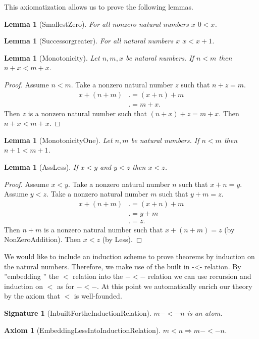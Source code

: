 \documentclass[10pt]{article}
\newenvironment{forthel}{\begin{leftbar}}{\end{leftbar}}
\theoremstyle{definition}
\theoremstyle{plain}
\newtheorem{signature}[theorem]{Signature}
\newtheorem{lemma}[theorem]{Lemma}
\newtheorem{axiom}[theorem]{Axiom}
\theoremstyle{remark}
\begin{document}
This axiomatization allows us to prove the following lemmas.
\begin{forthel}
	\begin{lemma}[SmallestZero]
		For all nonzero natural numbers $x$ $0<x$.
	\end{lemma}
	\begin{lemma}[Successorgreater]
		For all natural numbers $x$ $x<x+1$.
	\end{lemma}
	\begin{lemma}[Monotonicity]
		Let $n,m,x$ be natural numbers. If $n<m$ then $n+x < m+x$.
	\end{lemma}
	\begin{proof}
			Assume $n < m$.
			Take a nonzero natural number $z$ such that $n+z=m$.
			\begin{align*}
				x + (n+m) &.= (x+n)+m \tag*{AssAdd, ComAdd} \\
					  &.= m+x.
			\end{align*}
			Then $z$ is a nonzero natural number such that $(n+x)+z=m+x$.
			Then $n+x < m+x$.
	\end{proof}
	\begin{lemma}[MonotonicityOne]
		Let $n,m$ be natural numbers. If $n<m$ then $n+1<m+1$.
	\end{lemma}
	\begin{lemma}[AssLess]
		If $x<y$ and $y<z$ then $x<z$.
	\end{lemma}
	\begin{proof}
		Assume $x<y$. Take a nonzero natural number $n$ such that $x+n=y$. Assume $y<z$. Take a nonzero natural number $m$ such that $y+m=z$.
		\begin{align*}
			x+(n+m)&.=(x+n)+m \tag*{AssAdd}\\
			       &.=y+m\\
			       &.=z.
		\end{align*}
		Then $n+m$ is a nonzero natural number such that $x+(n+m)=z$ (by NonZeroAddition). Then $x<z$ (by Less).
	\end{proof}
\end{forthel}
We would like to include an induction scheme to prove theorems by induction on the natural numbers. Therefore, we make use of the built in -<- relation. By ''embedding '' the $<$ relation into the $-<-$ relation we can use recursion and induction on $<$ as for $-<-$. At this point we automatically enrich our theory by the axiom that $<$ is well-founded.
\begin{forthel}
	\begin{signature}[InbuiltFortheInductionRelation] 
	$m -<- n$ is an atom.
	\end{signature}
	\begin{axiom}[EmbeddingLessIntoInductionRelation] 
	$m < n \Rightarrow m -<- n$.
	\end{axiom}
\end{forthel}
\end{document}
